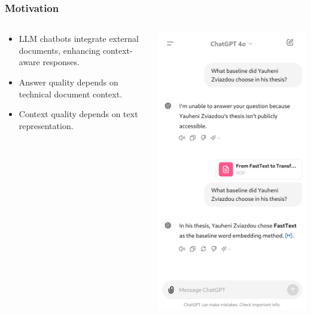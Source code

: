 \documentclass{beamer}
\begin{document}
\begin{frame}
  \frametitle{Motivation}
  \begin{columns}
    \begin{column}{0.5\textwidth}
      \begin{itemize}
        \item LLM chatbots integrate external documents, enhancing context-aware responses.        
        \item Answer quality depends on technical document context.        
        \item Context quality depends on text representation.        
      \end{itemize}
    \end{column}
    \begin{column}{0.5\textwidth}
      \includegraphics[scale=0.15]{src/fig/imgs/RAG_example.png}
    \end{column}
  \end{columns}
  

\end{frame}
\end{document}
